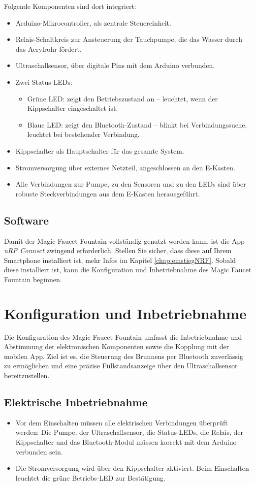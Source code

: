 Folgende Komponenten sind dort integriert:
\begin{itemize}
    \item Arduino-Mikrocontroller, als zentrale Steuereinheit.
    \item Relais-Schaltkreis zur Ansteuerung der Tauchpumpe, die das Wasser durch das Acrylrohr fördert.
    \item Ultraschallsensor, über digitale Pins mit dem Arduino verbunden.
    \item Zwei Status-LEDs:
    	\begin{itemize}
        \item Grüne LED: zeigt den Betriebszustand an – leuchtet, wenn der Kippschalter eingeschaltet ist.
        \item Blaue LED: zeigt den Bluetooth-Zustand – blinkt bei Verbindungssuche, leuchtet bei bestehender Verbindung.
        \end{itemize}
    \item Kippschalter als Hauptschalter für das gesamte System.
    \item Stromversorgung über externes Netzteil, angeschlossen an den E-Kasten.
    \item Alle Verbindungen zur Pumpe, zu den Sensoren und zu den LEDs sind über robuste Steckverbindungen aus dem E-Kasten herausgeführt.
\end{itemize}

\subsection{Software}
Damit der Magic Faucet Fountain vollständig genutzt werden kann, ist die App \textit{nRF Connect} zwingend erforderlich. Stellen Sie sicher, dass diese auf Ihrem Smartphone installiert ist, mehr Infos im Kapitel \ref{chap:einstiegNRF}. Sobald diese installiert ist, kann die Konfiguration und Inbetriebnahme des Magic Faucet Fountain beginnen.

\section{Konfiguration und Inbetriebnahme}
Die Konfiguration des Magic Faucet Fountain umfasst die Inbetriebnahme und Abstimmung der elektronischen Komponenten sowie die Kopplung mit der mobilen App. Ziel ist es, die Steuerung des Brunnens per Bluetooth zuverlässig zu ermöglichen und eine präzise Füllstandsanzeige über den Ultraschallsensor bereitzustellen.

\subsection{Elektrische Inbetriebnahme}
\begin{itemize}
	\item Vor dem Einschalten müssen alle elektrischen Verbindungen überprüft werden: Die Pumpe, der Ultraschallsensor, die Status-LEDs, die Relais, der Kippschalter und das Bluetooth-Modul müssen korrekt mit dem Arduino verbunden sein.
	\item Die Stromversorgung wird über den Kippschalter aktiviert. Beim Einschalten leuchtet die grüne Betriebs-LED zur Bestätigung.
\end{itemize}

